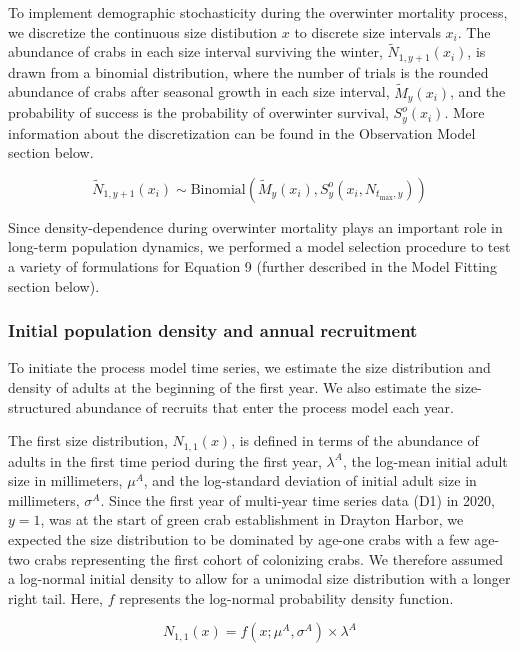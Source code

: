 \documentclass{article}
\begin{document}
To implement demographic stochasticity during the overwinter mortality process, we discretize the continuous size distibution $x$ to discrete size intervals $x_i$. The abundance of crabs in each size interval surviving the winter, $\tilde{N}_{1,y+1}(x_i)$, is drawn from a binomial distribution, where the number of trials is the rounded abundance of crabs after seasonal growth in each size interval, $\tilde{M}_y(x_i)$, and the probability of success is the probability of overwinter survival, $S^o_y(x_i)$. More information about the discretization can be found in the Observation Model section below.

\begin{equation}
\tilde{N}_{1,y+1}(x_i) \sim \text{Binomial}\left(\tilde{M}_y(x_i),  S_y^o(x_i, N_{t_{\text{max}},y})\right)
\end{equation}

Since density-dependence during overwinter mortality plays an important role in long-term population dynamics, we performed a model selection procedure to test a variety of formulations for Equation 9 (further described in the Model Fitting section below).

\subsubsection*{Initial population density and annual recruitment}

To initiate the process model time series, we estimate the size distribution and density of adults at the beginning of the first year. We also estimate the size-structured abundance of recruits that enter the process model each year. 

The first size distribution, $N_{1, 1}(x)$, is defined in terms of the abundance of adults in the first time period during the first year, $\lambda^{A}$, the log-mean initial adult size in millimeters, $\mu^A$, and the log-standard deviation of initial adult size in millimeters, $\sigma^A$. Since the first year of multi-year time series data (D1) in 2020, $y = 1$, was at the start of green crab establishment in Drayton Harbor, we expected the size distribution to be dominated by age-one crabs with a few age-two crabs representing the first cohort of colonizing crabs. We therefore assumed a log-normal initial density to allow for a unimodal size distribution with a longer right tail. Here, $f$ represents the log-normal probability density function.

\begin{equation}
N_{1, 1}(x) = f(x; \mu^A, \sigma^A) \times \lambda^A
\end{equation}
\end{document}
